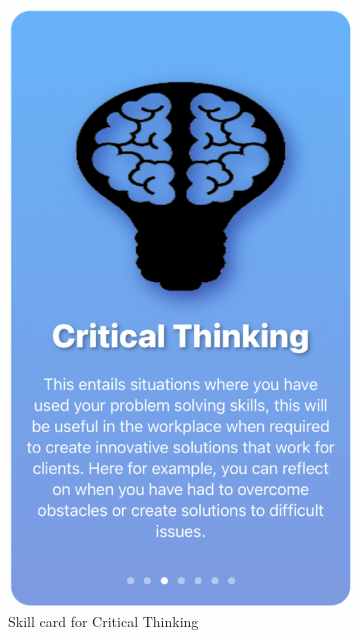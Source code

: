 \documentclass{l4proj}
\begin{document}
\begin{appendices}
\begin{figure}[H]
\begin{subfigure}[b]{0.3\textwidth}
        \includegraphics[scale=0.2]{images/CriticalThinkingCard.pdf}
        \caption{Skill card for Critical Thinking}
        \label{fig:CriticalThinkingCard}
    \end{subfigure}
    \begin{subfigure}[b]{0.3\textwidth}

\end{subfigure}
\end{figure}
\end{appendices}
\end{document}
